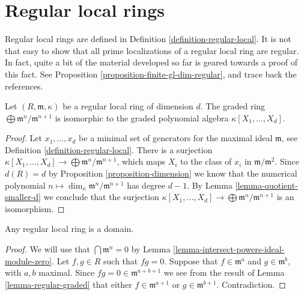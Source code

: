 \section{Regular local rings}
\label{section-regular}

\noindent
Regular local rings are defined in Definition \ref{definition-regular-local}.
It is not that easy to show that all prime localizations of a regular local
ring are regular. In fact, quite a bit of the material developed so far is
geared towards a proof of this fact. See
Proposition \ref{proposition-finite-gl-dim-regular}, and
trace back the references.

\begin{lemma}
\label{lemma-regular-graded}
Let $(R, \mathfrak m, \kappa)$ be a regular local ring of dimension $d$.
The graded ring $\bigoplus \mathfrak m^n / \mathfrak m^{n + 1}$
is isomorphic to the graded polynomial algebra
$\kappa[X_1, \ldots, X_d]$.
\end{lemma}

\begin{proof}
Let $x_1, \ldots, x_d$ be a minimal set of generators
for the maximal ideal $\mathfrak m$, see
Definition \ref{definition-regular-local}.
There is a surjection $\kappa[X_1, \ldots, X_d]
\to \bigoplus \mathfrak m^n/\mathfrak m^{n + 1}$,
which maps $X_i$ to the class of $x_i$ in $\mathfrak m/\mathfrak m^2$.
Since $d(R) = d$ by
Proposition \ref{proposition-dimension}
we know that the numerical
polynomial $n \mapsto \dim_\kappa \mathfrak m^n/\mathfrak m^{n + 1}$
has degree $d - 1$. By Lemma \ref{lemma-quotient-smaller-d} we
conclude that the surjection $\kappa[X_1, \ldots, X_d]
\to \bigoplus \mathfrak m^n/\mathfrak m^{n + 1}$ is an isomorphism.
\end{proof}

\begin{lemma}
\label{lemma-regular-domain}
Any regular local ring is a domain.
\end{lemma}

\begin{proof}
We will use that $\bigcap \mathfrak m^n = 0$
by Lemma \ref{lemma-intersect-powers-ideal-module-zero}.
Let $f, g \in R$ such that $fg = 0$.
Suppose that $f \in \mathfrak m^a$ and
$g \in \mathfrak m^b$, with $a, b$ maximal.
Since $fg = 0 \in \mathfrak m^{a + b + 1}$
we see from the result of Lemma \ref{lemma-regular-graded}
that either $f \in \mathfrak m^{a + 1}$ or
$g \in \mathfrak m^{b + 1}$. Contradiction.
\end{proof}

